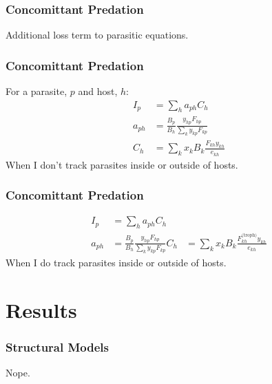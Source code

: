 \documentclass{beamer}
\begin{document}
\begin{frame}
\frametitle{Concomittant Predation}


Additional loss term to parasitic equations.

\end{frame}

\begin{frame}
\frametitle{Concomittant Predation}
For a parasite, $p$ and host, $h$:
\begin{align*}
I_p & = \sum_h a_{ph}C_h\\
a_{ph}& = \frac{B_p}{B_h}\frac{y_{hp}F_{hp}}{\sum_{k}y_{kp}F_{kp}}\\ 
C_h &= \sum_kx_kB_k\frac{F_{kh}y_{kh}}{e_{kh}} 
\end{align*}
When I don't track parasites inside or outside of hosts. 
\end{frame}

\begin{frame}
\frametitle{Concomittant Predation}
\begin{align*}
I_p & = \sum_h a_{ph}C_h\\
a_{ph} &= \frac{B_p}{B_h}\frac{y_{hp}F_{hp}}{\sum_{k}y_{kp}F_{kp}} \label{aph2}
C_h &= \sum_kx_kB_k\frac{F^\text{(troph)}_{kh}y_{kh}}{e_{kh}} 
\end{align*}
When I do track parasites inside or outside of hosts.
\end{frame}

\section{Results}

\begin{frame}
\frametitle{Structural Models}
Nope.
\end{frame}
\end{document}
